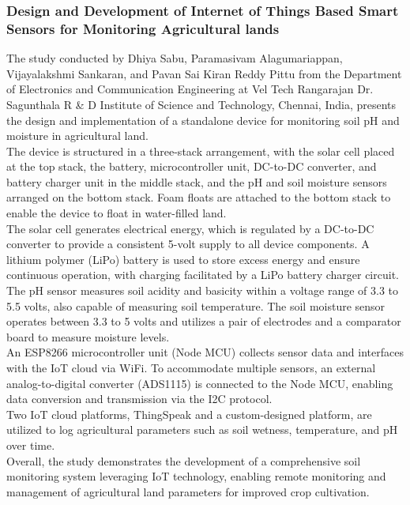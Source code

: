 \documentclass[12pt, a4paper]{article}
\begin{document}
\subsubsection{Design and Development of Internet of Things Based Smart Sensors for Monitoring Agricultural lands}
The study conducted by Dhiya Sabu, Paramasivam Alagumariappan, Vijayalakshmi Sankaran, and Pavan Sai Kiran Reddy Pittu  \cite{sabu2023design} from the Department of Electronics and Communication Engineering at Vel Tech Rangarajan Dr. Sagunthala R & D Institute of Science and Technology, Chennai, India, presents the design and implementation of a standalone device for monitoring soil pH and moisture in agricultural land.\\
The device is structured in a three-stack arrangement, with the solar cell placed at the top stack, the battery, microcontroller unit, DC-to-DC converter, and battery charger unit in the middle stack, and the pH and soil moisture sensors arranged on the bottom stack. Foam floats are attached to the bottom stack to enable the device to float in water-filled land.\\
The solar cell generates electrical energy, which is regulated by a DC-to-DC converter to provide a consistent 5-volt supply to all device components. A lithium polymer (LiPo) battery is used to store excess energy and ensure continuous operation, with charging facilitated by a LiPo battery charger circuit.\\
The pH sensor measures soil acidity and basicity within a voltage range of 3.3 to 5.5 volts, also capable of measuring soil temperature. The soil moisture sensor operates between 3.3 to 5 volts and utilizes a pair of electrodes and a comparator board to measure moisture levels.\\
An ESP8266 microcontroller unit (Node MCU) collects sensor data and interfaces with the IoT cloud via WiFi. To accommodate multiple sensors, an external analog-to-digital converter (ADS1115) is connected to the Node MCU, enabling data conversion and transmission via the I2C protocol.\\
Two IoT cloud platforms, ThingSpeak and a custom-designed platform, are utilized to log agricultural parameters such as soil wetness, temperature, and pH over time.\\
Overall, the study demonstrates the development of a comprehensive soil monitoring system leveraging IoT technology, enabling remote monitoring and management of agricultural land parameters for improved crop cultivation.
\end{document}
